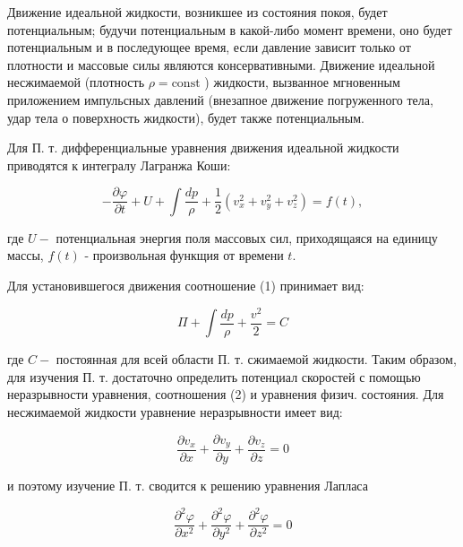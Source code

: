 \documentclass[10pt]{article}
\begin{document}
Движение идеальной жидкости, возникшее из состояния покоя, будет потенциальным; будучи потенциальным в какой-либо момент времени, оно будет потенциальным и в последующее время, если давление зависит только от плотности и массовые силы являются консервативными. Движение идеальной несжимаемой (плотность $\rho=\mathrm{const}$ ) жидкости, вызванное мгновенным приложением импульсных давлений (внезапное движение погруженного тела, удар тела о поверхность жидкости), будет также потенциальным.



Для П. т. дифференциальные уравнения движения идеальной жидкости приводятся к интегралу Лагранжа Коши:



\[

-\frac{\partial \varphi}{\partial t}+U+\int \frac{d p}{\rho}+\frac{1}{2}\left(v_{x}^{2}+v_{y}^{2}+v_{z}^{2}\right)=f(t),

\]



где $U-$ потенциальная энергия поля массовых сил, приходящаяся на единицу массы, $f(t)$ - произвольная функщия от времени $t$.



Для установившегося движения соотношение (1) принимает вид:



\[

\Pi+\int \frac{d p}{\rho}+\frac{v^{2}}{2}=C

\]



где $C-$ постоянная для всей области П. т. сжимаемой жидкости. Таким образом, для изучения П. т. достаточно определить потенциал скоростей с помощью неразрывности уравнения, соотношения (2) и уравнения физич. состояния. Для несжимаемой жидкости уравнение неразрывности имеет вид:



\[

\frac{\partial v_{x}}{\partial x}+\frac{\partial v_{y}}{\partial y}+\frac{\partial v_{z}}{\partial z}=0

\]



и поэтому изучение П. т. сводится к решению уравнения Лапласа



\[

\frac{\partial^{2} \varphi}{\partial x^{2}}+\frac{\partial^{2} \varphi}{\partial y^{2}}+\frac{\partial^{2} \varphi}{\partial z^{2}}=0

\]
\end{document}
